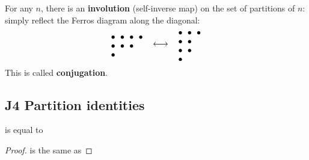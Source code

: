 \documentclass[12pt]{article}
\begin{document}
\begin{proposition}
    For any $n$, there is an \textbf{involution} (self-inverse map) on the set of partitions of $n$: simply reflect the Ferros diagram along the diagonal: \[\begin{tabular}[t]{ccc}
        {\begin{tikzcd}[ampersand replacement=\&,cramped,sep=0pt]
            \bullet \& \bullet \& \bullet \& \bullet \\
            \bullet \& \bullet \& \bullet \\
            \bullet
        \end{tikzcd}} & $\longleftrightarrow $ & {\begin{tikzcd}[ampersand replacement=\&,cramped,sep=0pt]
            \bullet \& \bullet \& \bullet \\
            \bullet \& \bullet \\
            \bullet \& \bullet \\
            \bullet
        \end{tikzcd}}
    \end{tabular}\]
    This is called \textbf{conjugation}.
\end{proposition}

\subsection{J4 Partition identities}
\begin{theorem}
     is equal to 
\end{theorem}
\begin{proof}
     is the same as 
\end{proof}
\end{document}
